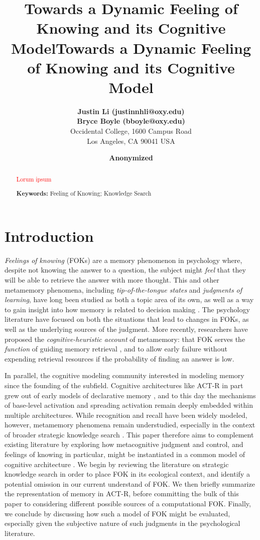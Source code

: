 \documentclass[10pt,letterpaper]{article}
\title{Towards a Dynamic Feeling of Knowing and its Cognitive Model}
\author{
        {\large \bf Justin Li (justinnhli@oxy.edu)} \\
        {\large \bf Bryce Boyle (bboyle@oxy.edu)} \\
        Occidental College, 1600 Campus Road \\
        Los Angeles, CA 90041 USA
    }
\title{Towards a Dynamic Feeling of Knowing and its Cognitive Model}
\author{
    {\large \bf Anonymized}
}
\newcommand{\fixme}[2][]{#2}
\renewcommand{\fixme}[2][]{\textcolor{red}{#2}}
\begin{document}
\maketitle

\begin{abstract}

    \fixme{Lorum ipsum}

    \textbf{Keywords:} Feeling of Knowing; Knowledge Search

\end{abstract}


\section{Introduction}

\emph{Feelings of knowing} (FOKs) are a memory phenomenon in psychology where, despite not knowing the answer to a question, the subject might \emph{feel} that they will be able to retrieve the answer with more thought.
This and other metamemory phenomena, including \emph{tip-of-the-tongue states} and \emph{judgments of learning}, have long been studied as both a topic area of its own, as well as a way to gain insight into how memory is related to decision making \cite{Nelson1994WhyInvestigateMetacognition}.
The psychology literature have focused on both the situations that lead to changes in FOKs, as well as the underlying sources of the judgment.
More recently, researchers have proposed the \emph{cognitive-heuristic account} of metamemory: that FOK serves the \emph{function} of guiding memory retrieval \cite{Schwartz2011TipOfThe}, and to allow early failure without expending retrieval resources if the probability of finding an answer is low.

In parallel, the cognitive modeling community interested in modeling memory since the founding of the subfield.
Cognitive architectures like ACT-R \cite{Anderson2007HowCanThe} in part grew out of early models of declarative memory \cite{Anderson1983ASpreadingActivation, Anderson1991ReflectionsOfThe}, and to this day the mechanisms of base-level activation and spreading activation remain deeply embedded within multiple architectures.
While recognition and recall have been widely modeled, however, metamemory phenomena remain understudied, especially in the context of broader strategic knowledge search \cite{Newell1972HumanProblemSolving}.
This paper therefore aims to complement existing literature by exploring how metacognitive judgment and control, and feelings of knowing in particular, might be instantiated in a common model of cognitive architecture \cite{Laird2017AStandardModel}.
We begin by reviewing the literature on strategic knowledge search in order to place FOK in its ecological context, and identify a potential omission in our current understand of FOK.
We then briefly summarize the representation of memory in ACT-R, before committing the bulk of this paper to considering different possible sources of a computational FOK.
Finally, we conclude by discussing how such a model of FOK might be evaluated, especially given the subjective nature of such judgments in the psychological literature.
\end{document}
